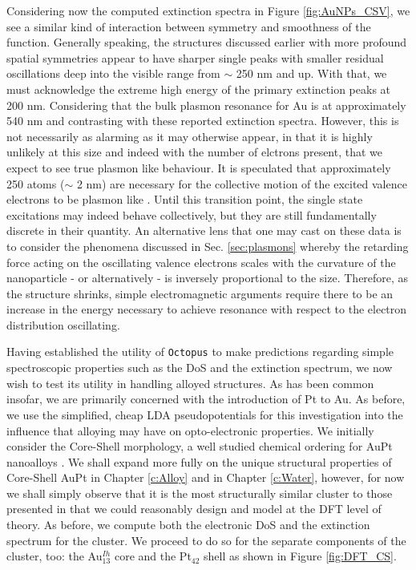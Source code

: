 Considering now the computed extinction spectra in Figure \ref{fig:AuNPs_CSV}, we see a similar kind of interaction between symmetry and smoothness of the function. Generally speaking, the structures discussed earlier with more profound spatial symmetries appear to have sharper single peaks with smaller residual oscillations deep into the visible range from $\sim$ 250 nm and up. With that, we must acknowledge the extreme high energy of the primary extinction peaks at 200 nm. Considering that the bulk plasmon resonance for Au is at approximately 540 nm \cite{AuPlasmonRev} and contrasting with these reported extinction spectra. However, this is not necessarily as alarming as it may otherwise appear, in that it is highly unlikely at this size and indeed with the number of elctrons present, that we expect to see true plasmon like behaviour. It is speculated that approximately 250 atoms ($\sim$ 2 nm) are necessary for the collective motion of the excited valence electrons to be plasmon like \cite{SmallPlasmonBad}. Until this transition point, the single state excitations may indeed behave collectively, but they are still fundamentally discrete in their quantity. An alternative lens that one may cast on these data is to consider the phenomena discussed in Sec. \ref{sec:plasmons} whereby the retarding force acting on the oscillating valence electrons scales with the curvature of the nanoparticle - or alternatively - is inversely proportional to the size. Therefore, as the structure shrinks, simple electromagnetic arguments require there to be an increase in the energy necessary to achieve resonance with respect to the electron distribution oscillating.

 Having established the utility of \texttt{Octopus} to make predictions regarding simple spectroscopic properties such as the DoS and the extinction spectrum, we now wish to test its utility in handling alloyed structures. As has been common insofar, we are primarily concerned with the introduction of Pt to Au. As before, we use the simplified, cheap LDA pseudopotentials for this investigation into the influence that alloying may have on opto-electronic properties. We initially consider the Core-Shell morphology, a well studied chemical ordering for AuPt nanoalloys \cite{nano9111644,5257275,https://doi.org/10.1002/ppsc.201700401,doi:10.1021/acsami.9b10158,Namsoon2021}. We shall expand more fully on the unique structural properties of Core-Shell AuPt in Chapter \ref{c:Alloy} and in Chapter \ref{c:Water}, however, for now we shall simply observe that it is the most structurally similar cluster to those presented in \cite{JorgeStructure,Jorge2019} that we could reasonably design and model at the DFT level of theory. As before, we compute both the electronic DoS and the extinction spectrum for the cluster. We proceed to do so for the separate components of the cluster, too: the Au$_{13}^{Ih}$ core and the Pt$_{42}$ shell as shown in Figure \ref{fig:DFT_CS}.

